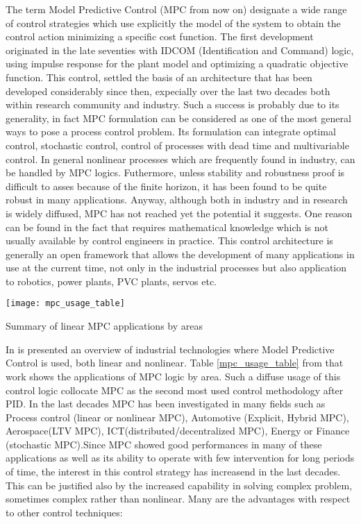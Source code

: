 The term Model Predictive Control (MPC from now on) designate a wide range of control strategies which use explicitly the model of the system to obtain the control action minimizing a specific cost function. The first development originated in the late seventies with IDCOM (Identification and Command) logic, using impulse response for the plant model and optimizing a quadratic objective function. This control, settled the basis of an architecture that has been developed considerably since then, expecially over the last two decades both within research community and industry.
Such a success is probably due to its generality, in fact MPC formulation can be considered as one of the most general ways to pose a process control problem. Its formulation can integrate optimal control, stochastic control, control of processes with dead time and multivariable control. In general nonlinear processes which are frequently found in industry, can be handled by MPC logics. Futhermore, unless stability and robustness proof is difficult to asses because of the finite horizon, it has been found to be quite robust in many applications. Anyway, although both in industry and in research is widely diffused, MPC has not reached yet the potential it suggests. One reason can be found in the fact that requires mathematical knowledge which is not usually available by control engineers in practice. This control architecture is generally an open framework that allows the development of many applications in use at the current time, not only in the industrial processes but also application to robotics, power plants, PVC plants, servos etc. 
\begin{table}
	\centering
	\texttt{[image: mpc\_usage\_table]}
	\caption{Summary of linear MPC applications by areas}
	\label{mpc_usage_table}
\end{table}
In \cite{qin2003survey} is presented an overview of industrial technologies where Model Predictive Control is used, both linear and nonlinear. Table \ref{mpc_usage_table} from that work shows the applications of MPC logic by area. Such a diffuse usage of this control logic collocate MPC as the second most used control methodology after PID. In the last decades MPC has been investigated in many fields such as Process control (linear or nonlinear MPC), Automotive (Explicit, Hybrid MPC), Aerospace(LTV MPC), ICT(distributed/decentralized MPC), Energy or Finance (stochastic MPC).Since MPC showed good performances in many of these applications as well as its ability to operate with few intervention for long periods of time, the interest in this control strategy has increasend in the last decades. This can be justified also by the increased capability in solving complex problem, sometimes complex rather than nonlinear. Many are the advantages with respect to other control techniques: 
